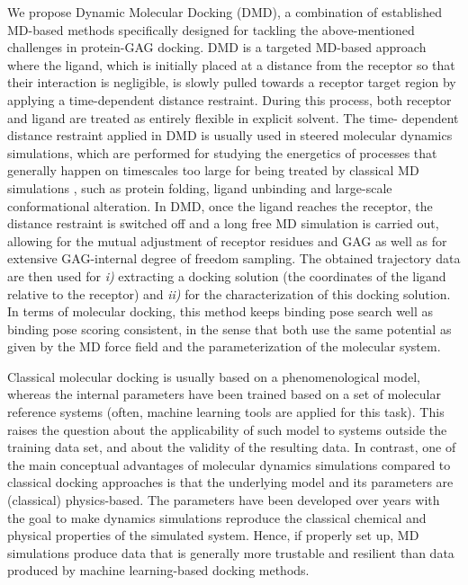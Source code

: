 
We propose Dynamic Molecular Docking (DMD), a combination of established
MD-based methods specifically designed for tackling the above-mentioned
challenges in protein-GAG docking. DMD is a targeted MD-based approach where the
ligand, which is initially placed at a distance from the receptor so that their
interaction is negligible, is slowly pulled towards a receptor target region by
applying a time-dependent distance restraint. During this process, both receptor
and ligand are treated as entirely flexible in explicit solvent. The time-
dependent distance restraint applied in DMD is usually used in steered molecular
dynamics simulations, which are performed for studying the energetics of
processes that generally happen on timescales too large for being treated by
classical MD simulations \cite{xiong_free_2006}, such as protein folding, ligand
unbinding and large-scale conformational alteration. In DMD, once the ligand
reaches the receptor, the distance restraint is switched off and a long free MD
simulation is carried out, allowing for the mutual adjustment of receptor
residues and GAG as well as for extensive GAG-internal degree of freedom
sampling. The obtained trajectory data are then used for \textit{i)} extracting
a docking solution (the coordinates of the ligand relative to the receptor) and
\textit{ii)} for the characterization of this docking solution. In terms of
molecular docking, this method keeps binding pose search well as binding pose
scoring consistent, in the sense that both use the same potential as given by
the MD force field and the parameterization of the molecular system.

Classical molecular docking is usually based on a phenomenological model,
whereas the internal parameters have been trained based on a set of molecular
reference systems (often, machine learning tools are applied for this task).
This raises the question about the applicability of such model to systems
outside the training data set, and about the validity of the resulting data. In
contrast, one of the main conceptual advantages of molecular dynamics
simulations compared to classical docking approaches is that the underlying
model and its parameters are (classical) physics-based. The parameters have been
developed over years with the goal to make dynamics simulations reproduce the
classical chemical and physical properties of the simulated system. Hence, if
properly set up, MD simulations produce data that is generally more trustable
and resilient than data produced by machine learning-based docking methods.

